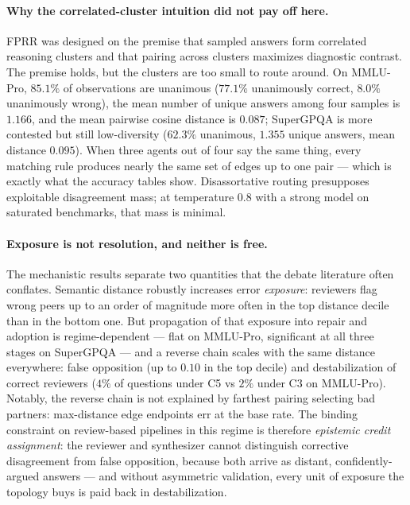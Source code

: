\documentclass[11pt]{article}
\begin{document}
\paragraph{Why the correlated-cluster intuition did not pay off here.}
FPRR was designed on the premise that sampled answers form correlated reasoning clusters and that pairing across clusters maximizes diagnostic contrast. The premise holds, but the clusters are too small to route around. On MMLU-Pro, $85.1\%$ of observations are unanimous ($77.1\%$ unanimously correct, $8.0\%$ unanimously wrong), the mean number of unique answers among four samples is $1.166$, and the mean pairwise cosine distance is $0.087$; SuperGPQA is more contested but still low-diversity ($62.3\%$ unanimous, $1.355$ unique answers, mean distance $0.095$). When three agents out of four say the same thing, every matching rule produces nearly the same set of edges up to one pair --- which is exactly what the accuracy tables show. Disassortative routing presupposes exploitable disagreement mass; at temperature $0.8$ with a strong model on saturated benchmarks, that mass is minimal.

\paragraph{Exposure is not resolution, and neither is free.}
The mechanistic results separate two quantities that the debate literature often conflates. Semantic distance robustly increases error \emph{exposure}: reviewers flag wrong peers up to an order of magnitude more often in the top distance decile than in the bottom one. But propagation of that exposure into repair and adoption is regime-dependent --- flat on MMLU-Pro, significant at all three stages on SuperGPQA --- and a reverse chain scales with the same distance everywhere: false opposition (up to $0.10$ in the top decile) and destabilization of correct reviewers ($4\%$ of questions under C5 vs $2\%$ under C3 on MMLU-Pro). Notably, the reverse chain is not explained by farthest pairing selecting bad partners: max-distance edge endpoints err at the base rate. The binding constraint on review-based pipelines in this regime is therefore \emph{epistemic credit assignment}: the reviewer and synthesizer cannot distinguish corrective disagreement from false opposition, because both arrive as distant, confidently-argued answers --- and without asymmetric validation, every unit of exposure the topology buys is paid back in destabilization.
\end{document}
